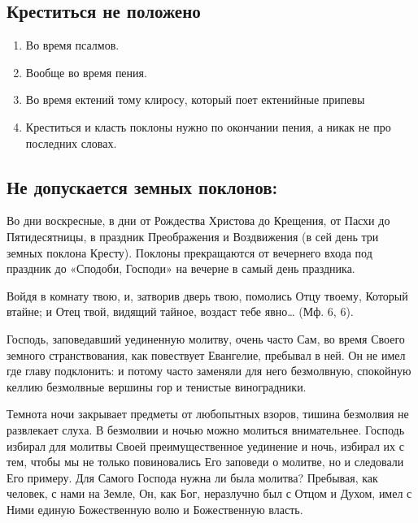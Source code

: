 \subsection*{Креститься не положено}


\begin{enumerate}


\item Во время псалмов.

\item Вообще во время пения.

\item Во время ектений тому клиросу, который поет ектенийные припевы

\item Креститься и класть поклоны нужно по окончании пения, а никак не про последних словах.


\end{enumerate}






\subsection*{Не допускается земных поклонов:}






Во дни воскресные, в дни от Рождества Христова до Крещения, от Пасхи до Пятидесятницы, в праздник Преображения и Воздвижения (в сей день три земных поклона Кресту). Поклоны прекращаются от вечернего входа под праздник до «Сподоби, Господи» на вечерне в самый день праздника.
\mychapterending

\label{chap:text147}
 


Войдя в комнату твою, и, затворив дверь твою, помолись Отцу твоему, Который втайне; и Отец твой, видящий тайное, воздаст тебе явно… (Мф. 6, 6).

Господь, заповедавший уединенную молитву, очень часто Сам, во время Своего земного странствования, как повествует Евангелие, пребывал в ней. Он не имел где главу подклонить: и потому часто заменяли для него безмолвную, спокойную келлию безмолвные вершины гор и тенистые виноградники.

Темнота ночи закрывает предметы от любопытных взоров, тишина безмолвия не развлекает слуха. В безмолвии и ночью можно молиться внимательнее. Господь избирал для молитвы Своей преимущественное уединение и ночь, избирал их с тем, чтобы мы не только повиновались Его заповеди о молитве, но и следовали Его примеру. Для Самого Господа нужна ли была молитва? Пребывая, как человек, с нами на Земле, Он, как Бог, неразлучно был с Отцом и Духом, имел с Ними единую Божественную волю и Божественную власть.

